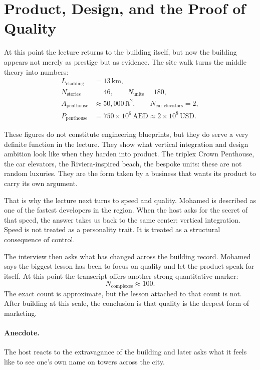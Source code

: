 \section{Product, Design, and the Proof of Quality}

At this point the lecture returns to the building itself, but now the building appears not merely as prestige but as evidence. The site walk turns the middle theory into numbers:
\begin{align}
L_{\text{cladding}} &= 13\,\mathrm{km},\\
N_{\text{stories}} &= 46, \qquad N_{\text{units}} = 180,\\
A_{\text{penthouse}} &\approx 50{,}000\,\mathrm{ft}^2, \qquad N_{\text{car elevators}} = 2,\\
P_{\text{penthouse}} &= 750 \times 10^{6}\,\mathrm{AED}
\approx 2 \times 10^{8}\,\mathrm{USD}.
\end{align}

These figures do not constitute engineering blueprints, but they do serve a very definite function in the lecture. They show what vertical integration and design ambition look like when they harden into product. The triplex Crown Penthouse, the car elevators, the Riviera-inspired beach, the bespoke units: these are not random luxuries. They are the form taken by a business that wants its product to carry its own argument.

That is why the lecture next turns to speed and quality. Mohamed is described as one of the fastest developers in the region. When the host asks for the secret of that speed, the answer takes us back to the same center: vertical integration. Speed is not treated as a personality trait. It is treated as a structural consequence of control.

The interview then asks what has changed across the building record. Mohamed says the biggest lesson has been to focus on quality and let the product speak for itself. At this point the transcript offers another strong quantitative marker:
\begin{equation}
N_{\text{complexes}} \approx 100.
\end{equation}
The exact count is approximate, but the lesson attached to that count is not. After building at this scale, the conclusion is that quality is the deepest form of marketing.

\paragraph{Anecdote.} The host reacts to the extravagance of the building and later asks what it feels like to see one's own name on towers across the city.

